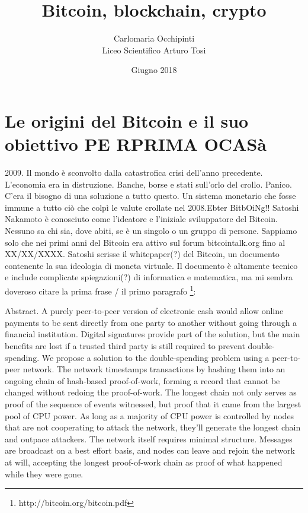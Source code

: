 \documentclass {article}
\title {{\Huge Bitcoin, blockchain, crypto}}
\author {Carlomaria Occhipinti\\Liceo Scientifico Arturo Tosi}
\date {Giugno 2018}
\begin{document}
\maketitle

\newpage

\tableofcontents


\newpage




\section {Le origini del Bitcoin e il suo obiettivo PE RPRIMA OCASà}



2009. Il mondo è sconvolto dalla catastrofica crisi dell'anno precedente.
L'economia era in distruzione. Banche, borse e stati sull'orlo del crollo. Panico.
C'era il bisogno di una soluzione a tutto questo. Un sistema monetario che fosse immune a tutto ciò che colpì le valute crollate nel 2008.Ebter BitbOiNg!!
Satoshi Nakamoto è conosciuto come l'ideatore e l'iniziale sviluppatore del Bitcoin. Nessuno sa chi sia, dove abiti, se è un singolo o un gruppo di persone. Sappiamo solo che nei primi anni del Bitcoin era attivo sul forum bitcointalk.org fino al XX/XX/XXXX.
Satoshi scrisse il whitepaper(?) del Bitcoin, un documento contenente la sua ideologia di moneta virtuale. Il documento è altamente tecnico e include complicate spiegazioni(?) di informatica e matematica, ma mi sembra doveroso citare la prima frase / il primo paragrafo \footnote{http://bitcoin.org/bitcoin.pdf}:

Abstract. A purely peer-to-peer version of electronic cash would allow online payments to be sent directly from one party to another without going through a financial institution. Digital signatures provide part of the solution, but the main benefits are lost if a trusted third party is still required to prevent double-spending. We propose a solution to the double-spending problem using a peer-to-peer network. The network timestamps transactions by hashing them into an ongoing chain of hash-based proof-of-work, forming a record that cannot be changed without redoing the proof-of-work. The longest chain not only serves as proof of the sequence of events witnessed, but proof that it came from the largest pool of CPU power. As long as a majority of CPU power is controlled by nodes that are not cooperating to attack the network, they'll generate the longest chain and outpace attackers. The network itself requires minimal structure. Messages are broadcast on a best effort basis, and nodes can leave and rejoin the network at will, accepting the longest proof-of-work chain as proof of what happened while they were gone. 
\end{document}
